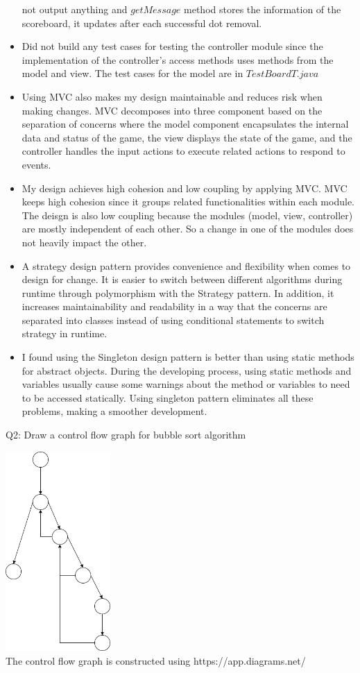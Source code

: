 \documentclass[12pt]{article}
\begin{document}
\begin{itemize}
        not output anything and $getMessage$ method stores the information of the scoreboard, it updates after each successful dot removal.
  \item Did not build any test cases for testing the controller module since the implementation of the controller's access methods uses 
        methods from the model and view. The test cases for the model are in $TestBoardT.java$
  \item Using MVC also makes my design maintainable and reduces risk when making changes. MVC decomposes into three 
        component based on the separation of concerns where the model component encapsulates the internal 
        data and status of the game, the view displays the state of the game, and the controller handles
        the input actions to execute related actions to respond to events.
  \item My design achieves high cohesion and low coupling by applying MVC. MVC keeps high cohesion since
        it groups related functionalities within each module. The deisgn is also low coupling because
        the modules (model, view, controller) are mostly independent of each other. So a change in one of the
        modules does not heavily impact the other.
  \item A strategy design pattern provides convenience and flexibility when comes to design for change. It is easier to switch
        between different algorithms during runtime through polymorphism with the Strategy pattern. In addition, it increases
        maintainability and readability in a way that the concerns are separated into classes instead of using
        conditional statements to switch strategy in runtime.
  \item I found using the Singleton design pattern is better than using static methods for abstract objects. During the developing process, using 
        static methods and variables usually cause some warnings about the method or variables to need to be accessed statically. Using singleton
        pattern eliminates all these problems, making a smoother development.
  
\end{itemize}



\noindent Q2: Draw a control flow graph for bubble sort algorithm

\begin{center}
  \includegraphics[width=0.3\textwidth]{Control_Flow_Graph.png} \\
  The control flow graph is constructed using https://app.diagrams.net/
\end{center}
\end{document}
